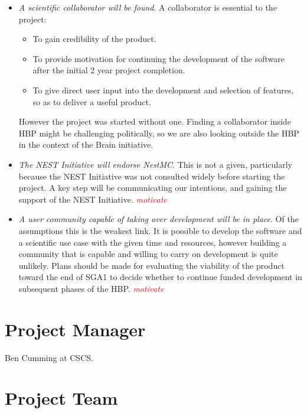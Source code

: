 \documentclass[11pt,a4paper]{article}
\newcommand{\hilight}[1]{\textit{\textcolor{Red}{#1}}}
\begin{document}
\begin{itemize}
    \item \emph{A scientific collaborator will be found}.
    A collaborator is essential to the project:
    \begin{itemize}
        \item To gain credibility of the product.
        \item To provide motivation for continuing the development of the software after the initial 2 year project completion.
        \item To give direct user input into the development and selection of features, so as to deliver a useful product.
    \end{itemize}
    However the project was started without one. Finding a collaborator inside HBP might be challenging politically, so we are also looking outside the HBP in the context of the Brain initiative.
    \item \emph{The NEST Initiative will endorse NestMC}. This is not a given, particularly because the NEST Initiative was not consulted widely before starting the project. A key step will be communicating our intentions, and gaining the support of the NEST Initiative. \hilight{motivate}
    \item \emph{A user community capable of taking over development will be in place}.
    Of the assumptions this is the weakest link.
    It is possible to develop the software and a scientific use case with the given time and resources, however building a community that is capable and willing to carry on development is quite unlikely.
    Plans should be made for evaluating the viability of the product toward the end of SGA1 to decide whether to continue funded development in subsequent phases of the HBP.
    \hilight{motivate}
\end{itemize}

\section{Project Manager}
Ben Cumming at CSCS.

\section{Project Team}
\end{document}
